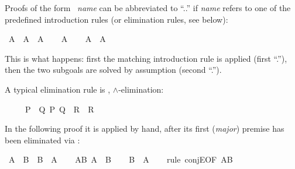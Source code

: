 \begin{isabellebody}
\begin{isamarkuptext}
Proofs of the form ~\emph{name}\isa{{\isacharparenright}}
can be abbreviated to ``..''  if \emph{name} refers to one of the
predefined introduction rules (or elimination rules, see below):%
\end{isamarkuptext}%
\isamarkuptrue%
\ {\isachardoublequote}A\ {\isasymlongrightarrow}\ A\ {\isasymand}\ A{\isachardoublequote}\isanewline
\isamarkupfalse%
\isanewline
\ \ \isamarkupfalse%
\ {\isachardoublequote}A{\isachardoublequote}\isanewline
\ \ \isamarkupfalse%
\ {\isachardoublequote}A\ {\isasymand}\ A{\isachardoublequote}\ \isamarkupfalse%
\isacommand{{\isachardot}{\isachardot}}\isanewline
\isamarkupfalse%
\isamarkupfalse%
%
\begin{isamarkuptext}%
\noindent
This is what happens: first the matching introduction rule 
is applied (first ``.''), then the two subgoals are solved by assumption
(second ``.'').%
\end{isamarkuptext}%
\isamarkuptrue%
%
\isamarkuptrue%
%
\begin{isamarkuptext}%
A typical elimination rule is , $\land$-elimination:
\begin{isabelle}%
\ \ \ \ \ {\isasymlbrakk}{\isacharquery}P\ {\isasymand}\ {\isacharquery}Q{\isacharsemicolon}\ {\isasymlbrakk}{\isacharquery}P{\isacharsemicolon}\ {\isacharquery}Q{\isasymrbrakk}\ {\isasymLongrightarrow}\ {\isacharquery}R{\isasymrbrakk}\ {\isasymLongrightarrow}\ {\isacharquery}R%
\end{isabelle}  In the following proof it is applied
by hand, after its first (\emph{major}) premise has been eliminated via
:%
\end{isamarkuptext}%
\isamarkuptrue%
\ {\isachardoublequote}A\ {\isasymand}\ B\ {\isasymlongrightarrow}\ B\ {\isasymand}\ A{\isachardoublequote}\isanewline
\isamarkupfalse%
\isanewline
\ \ \isamarkupfalse%
\ AB{\isacharcolon}\ {\isachardoublequote}A\ {\isasymand}\ B{\isachardoublequote}\isanewline
\ \ \isamarkupfalse%
\ {\isachardoublequote}B\ {\isasymand}\ A{\isachardoublequote}\isanewline
\ \ \isamarkupfalse%
\ {\isacharparenleft}rule\ conjE{\isacharbrackleft}OF\ AB{\isacharbrackright}{\isacharparenright}\ \ %
\end{isabellebody}
